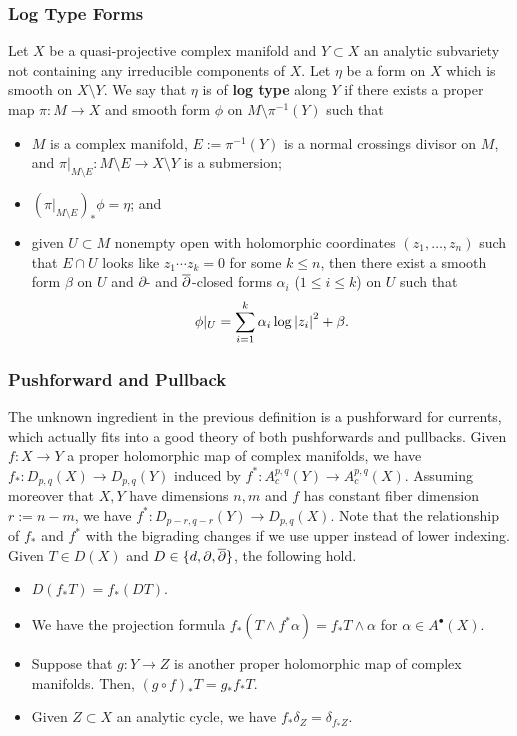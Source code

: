 \documentclass[11pt]{beamer}
\begin{document}
\begin{frame}
\frametitle{Log Type Forms}
Let $X$ be a quasi-projective complex manifold and $Y\subset X$ an analytic subvariety not containing any irreducible components of $X$. Let $\eta$ be a form on $X$ which is smooth on $X\setminus Y$. We say that $\eta$ is of \textbf{log type} along $Y$ if there exists a proper map $\pi: M\to X$ and smooth form $\phi$ on $M\setminus\pi^{-1}(Y)$ such that
\begin{itemize}
\item $M$ is a complex manifold, $E:=\pi^{-1}(Y)$ is a normal crossings divisor on $M$, and $\pi|_{M\setminus E}: M\setminus E\to X\setminus Y$ is a submersion;

\item $(\pi|_{M\setminus E})_*\phi=\eta$; and

\item given $U\subset M$ nonempty open with holomorphic coordinates $(z_1,\ldots,z_n)$ such that $E\cap U$ looks like $z_1\cdots z_k=0$ for some $k\leq n$, then there exist a smooth form $\beta$ on $U$ and $\partial$- and $\overline{\partial}$-closed forms $\alpha_i$ ($1\leq i\leq k$) on $U$ such that 
$$\phi|_U=\sum_{i=1}^k\alpha_i\log\left\lvert z_i\right\rvert^2+\beta.$$
\end{itemize}
\end{frame}


\begin{frame}
\frametitle{Pushforward and Pullback}
The unknown ingredient in the previous definition is a pushforward for currents, which actually fits into a good theory of both pushforwards and pullbacks. Given $f: X\to Y$ a proper holomorphic map of complex manifolds, we have $f_*: D_{p,q}(X)\to D_{p,q}(Y)$ induced by $f^*: A_c^{p,q}(Y)\to A_c^{p,q}(X)$. Assuming moreover that $X,Y$ have dimensions $n,m$ and $f$ has constant fiber dimension $r:=n-m$, we have $f^*: D_{p-r,q-r}(Y)\to D_{p,q}(X)$. Note that the relationship of $f_*$ and $f^*$ with the bigrading changes if we use upper instead of lower indexing. Given $T\in D(X)$ and $D\in\{d,\partial,\overline{\partial}\}$, the following hold.
\begin{itemize}
\item $D(f_*T)=f_*(DT)$.

\item We have the projection formula $f_*(T\wedge f^*\alpha)=f_*T\wedge\alpha$ for $\alpha\in A^{\bullet}(X)$.

\item Suppose that $g: Y\to Z$ is another proper holomorphic map of complex manifolds. Then, $(g\circ f)_*T=g_*f_*T$.

\item Given $Z\subset X$ an analytic cycle, we have $f_*\delta_Z=\delta_{f_*Z}$.
\end{itemize}
\end{frame}
\end{document}
